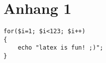 \chapter{Anhang 1}
\label{appendix:listing1}

\lstset{language=PHP}
\begin{lstlisting}[caption={Additional Code},nolol]
for($i=1; $i<123; $i++)
{
    echo "latex is fun! ;)";
}
\end{lstlisting}